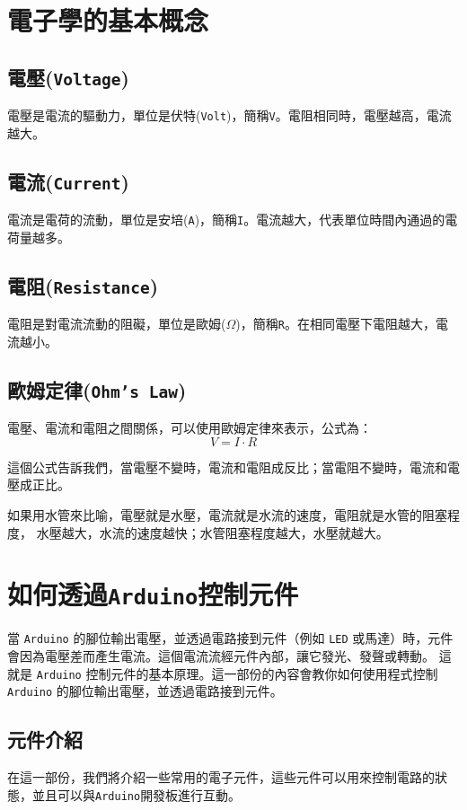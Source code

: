 \documentclass[12pt,a4paper]{article}
\begin{document}
\section{電子學的基本概念}

\subsection{電壓(\texttt{Voltage})}
電壓是電流的驅動力，單位是伏特(\texttt{Volt})，簡稱\texttt{V}。電阻相同時，電壓越高，電流越大。

\subsection{電流(\texttt{Current})}
電流是電荷的流動，單位是安培(\texttt{A})，簡稱\texttt{I}。電流越大，代表單位時間內通過的電荷量越多。

\subsection{電阻(\texttt{Resistance})}
電阻是對電流流動的阻礙，單位是歐姆($\Omega$)，簡稱\texttt{R}。在相同電壓下電阻越大，電流越小。

\subsection{歐姆定律(\texttt{Ohm's Law})}
電壓、電流和電阻之間關係，可以使用歐姆定律來表示，公式為：
$$
V = I \cdot R
$$

這個公式告訴我們，當電壓不變時，電流和電阻成反比；當電阻不變時，電流和電壓成正比。

如果用水管來比喻，電壓就是水壓，電流就是水流的速度，電阻就是水管的阻塞程度，
水壓越大，水流的速度越快；水管阻塞程度越大，水壓就越大。

\section{如何透過\texttt{Arduino}控制元件}

當 \texttt{Arduino} 的腳位輸出電壓，並透過電路接到元件（例如 \texttt{LED} 或馬達）時，元件會因為電壓差而產生電流。這個電流流經元件內部，讓它發光、發聲或轉動。
這就是 \texttt{Arduino} 控制元件的基本原理。這一部份的內容會教你如何使用程式控制 \texttt{Arduino} 的腳位輸出電壓，並透過電路接到元件。

\subsection{元件介紹}
在這一部份，我們將介紹一些常用的電子元件，這些元件可以用來控制電路的狀態，並且可以與\texttt{Arduino}開發板進行互動。
\end{document}
